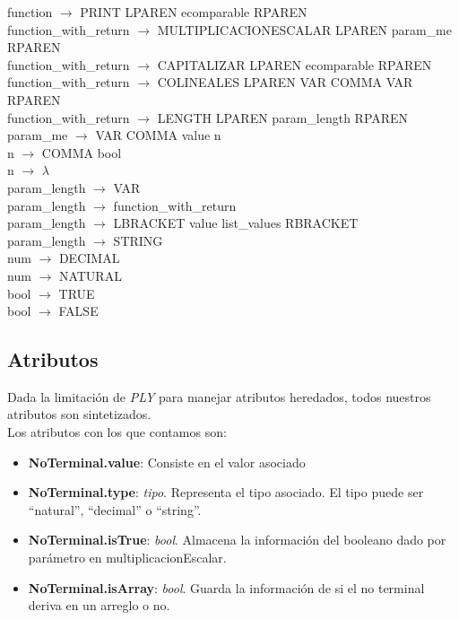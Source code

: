 \documentclass[10pt,a4paper]{article}
\begin{document}
function $\rightarrow$ PRINT LPAREN ecomparable RPAREN \\
function\_with\_return $\rightarrow$ MULTIPLICACIONESCALAR LPAREN param\_me RPAREN \\
function\_with\_return $\rightarrow$ CAPITALIZAR LPAREN ecomparable RPAREN \\
function\_with\_return $\rightarrow$ COLINEALES LPAREN VAR COMMA VAR RPAREN \\
function\_with\_return $\rightarrow$ LENGTH LPAREN param\_length RPAREN \\
param\_me $\rightarrow$ VAR COMMA value n \\
n $\rightarrow$ COMMA bool \\
n $\rightarrow$ $\lambda$ \\
param\_length $\rightarrow$ VAR \\
param\_length $\rightarrow$ function\_with\_return \\
param\_length $\rightarrow$ LBRACKET value list\_values RBRACKET \\
param\_length $\rightarrow$ STRING \\
num $\rightarrow$ DECIMAL \\
num $\rightarrow$ NATURAL \\
bool $\rightarrow$ TRUE \\
bool $\rightarrow$ FALSE \\

\newpage
\subsection{Atributos}

Dada la limitación de \textit{PLY} para manejar atributos heredados, todos nuestros atributos son sintetizados.\\

Los atributos con los que contamos son:
\begin{itemize}
\item \textbf{NoTerminal.value}: Consiste en el valor asociado
\item \textbf{NoTerminal.type}: \textit{tipo}. Representa el tipo asociado. El tipo puede ser ``natural'', ``decimal'' o ``string''.
\item \textbf{NoTerminal.isTrue}: \textit{bool}. Almacena la información del booleano dado por parámetro en multiplicacionEscalar.
\item \textbf{NoTerminal.isArray}: \textit{bool}. Guarda la información de si el no terminal deriva en un arreglo o no.
\end{itemize}
\end{document}
